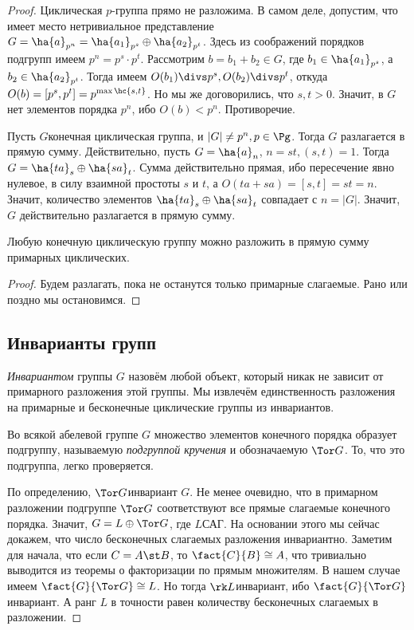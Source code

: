 \documentclass[a4paper]{article}
\begin{document}
\begin{proof}
 Циклическая $p$-группа прямо не разложима. В самом  деле, допустим, что имеет место нетривиальное
представление $G=\ha{a}_{p^n}=\ha{a_1}_{p^s}\oplus\ha{a_2}_{p^t}$. Здесь из соображений порядков подгрупп
имеем $p^n=p^s\cdot p^t$. Рассмотрим $b = b_1+b_2\in G$, где $b_1 \in \ha{a_1}_{p^s}$, а $b_2 \in
\ha{a_2}_{p^t}$. Тогда имеем $O(b_1)\divs p^s, O(b_2)\divs p^t$, откуда $O(b)=[p^s,p^t]=p^{\max\hc{s,t}}$. Но
мы же договорились, что $s, t>0$. Значит, в $G$ нет элементов порядка $p^n$, ибо $O(b) < p^n$. Противоречие.

 Пусть $G$\т конечная циклическая группа, и $|G| \neq p^n, p \in \Pg$.  Тогда $G$ разлагается в прямую
сумму. Действительно, пусть $G=\ha{a}_n$, $n=st, (s,t)=1$. Тогда $G=\ha{ta}_s\oplus\ha{sa}_t$. Сумма
действительно прямая, ибо пересечение явно нулевое, в силу взаимной простоты $s$ и $t$, а
$O(ta+sa)=[s,t]=st=n$. Значит, количество элементов $\ha{ta}_s\oplus\ha{sa}_t$ совпадает с $n=|G|$. Значит,
$G$ действительно разлагается в прямую сумму.

\begin{imp}
Любую конечную циклическую группу можно разложить в прямую сумму примарных циклических.
\end{imp}
\begin{proof}
Будем разлагать, пока не останутся только примарные слагаемые. Рано или поздно мы остановимся.
\end{proof}

\subsection{Инварианты групп}

\begin{df}
\emph{Инвариантом} группы $G$ назовём любой объект, который никак не зависит от примарного разложения этой
группы. Мы извлечём единственность разложения на примарные и бесконечные циклические группы из инвариантов.
\end{df}

\begin{df}
Во всякой абелевой группе $G$ множество элементов конечного порядка образует  подгруппу, называемую
\emph{подгруппой кручения} и обозначаемую $\Tor G$. То, что это подгруппа, легко
проверяется.
\end{df}

По определению, $\Tor G$\т инвариант $G$. Не менее очевидно, что в примарном разложении подгруппе
$\Tor G$ соответствуют все прямые слагаемые конечного порядка. Значит, $G=L\oplus \Tor G$, где $L$\т САГ. На
основании этого мы сейчас докажем, что число бесконечных слагаемых разложения инвариантно. Заметим для
начала, что если $C=A\st B$, то $\fact{C}{B} \cong A$, что тривиально выводится из теоремы о факторизации по
прямым множителям. В нашем случае имеем $\fact{G}{\Tor G} \cong L$. Но тогда $\rk L$\т инвариант, ибо
$\fact{G}{\Tor G}$\т инвариант. А ранг $L$ в точности равен количеству бесконечных слагаемых в разложении.


\end{proof}
\end{document}
